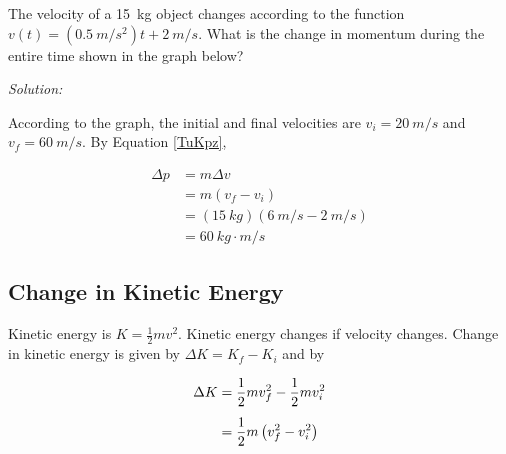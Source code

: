 \documentclass[dvipsnames]{article}
\begin{document}
\begin{example} \label{tbjCT}
The velocity of a \SI{15}{kg} object changes according to the function $v(t) = \left(\SI{0.5}{m/s^2}\right)t + \SI{2}{m/s}$. What is the change in momentum during the entire time shown in the graph below?

\begin{center}
\end{center}
\end{example}

\textit{Solution:}

According to the graph, the initial and final velocities are $v_i = \SI{20}{m/s}$ and $v_f = \SI{60}{m/s}$. By Equation \eqref{TuKpz},

\begin{align*}
    \Delta p &= m \Delta v \\[1ex]
    &= m (v_f - v_i) \\[1ex]
    &= (\SI{15}{kg})(\SI{6}{m/s} - \SI{2}{m/s}) \\[1ex]
    &= \boxed{\SI{60}{kg\cdot m/s}}
\end{align*}

\subsection{Change in Kinetic Energy}

Kinetic energy is $K = \frac{1}{2} mv^2$. Kinetic energy changes if velocity changes. Change in kinetic energy is given by $\Delta K = K_f - K_i$ and by

\begin{align} \label{h5Vlx}
    \Delta K &= \frac{1}{2}m v_f^2 - \frac{1}{2} m v_i^2 \\[1ex]
    &= \frac{1}{2} m \left(v_f^2 - v_i^2\right) \notag
\end{align}
\end{document}
